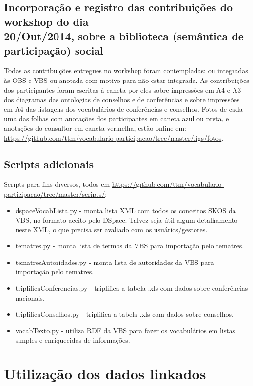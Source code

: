 \documentclass[12pt]{article}
\begin{document}
\subsection{Incorporação e registro das contribuições do workshop do dia \\20/Out/2014, sobre a biblioteca (semântica de participação) social}
Todas as contribuições entregues no workshop foram contempladas: ou integradas às OBS e VBS ou anotada com motivo para não estar integrada. As contribuições dos participantes foram escritas à caneta por eles sobre impressões em A4 e A3 dos diagramas das ontologias de conselhos e de conferências e sobre impressões em A4 das listagens dos vocabulários de conferências e conselhos. Fotos de cada uma das folhas com anotações dos participantes em caneta azul ou preta, e anotações do consultor em caneta vermelha, estão online em: \url{https://github.com/ttm/vocabulario-participacao/tree/master/figs/fotos}.

\subsection{Scripts adicionais}
Scripts para fins diversos, todos em \url{https://github.com/ttm/vocabulario-participacao/tree/master/scripts/}:
\begin{itemize}
    \item dspaceVocabLista.py - monta lista XML com todos os conceitos SKOS da VBS, no formato aceito pelo DSpace. Talvez seja útil algum detalhamento neste XML, o que precisa ser avaliado com os usuários/gestores.
    \item tematres.py - monta lista de termos da VBS para importação pelo tematres.
    \item tematresAutoridades.py - monta lista de autoridades da VBS para importação pelo tematres.
    \item triplificaConferencias.py - triplifica a tabela .xls com dados sobre conferências nacionais.
    \item triplificaConselhos.py -  triplifica a tabela .xls com dados sobre conselhos.
    \item vocabTexto.py - utiliza RDF da VBS para fazer os vocabulários em listas simples e enriquecidas de informações.
\end{itemize}

\section{Utilização dos dados linkados}\label{ap:ut}
\end{document}
